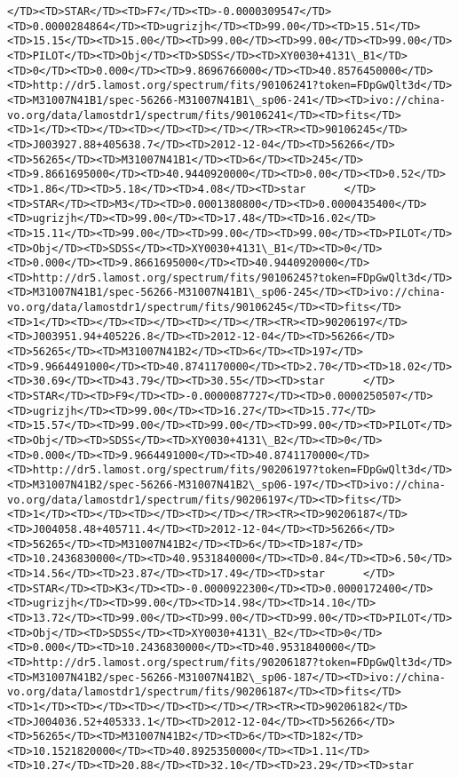 \documentclass[11pt]{article}
\begin{document}
\begin{Verbatim}[commandchars=\\\{\}]
     </TD><TD>STAR</TD><TD>F7</TD><TD>-0.0000309547</TD><TD>0.0000284864</TD><TD>ugrizjh</TD><TD>99.00</TD><TD>15.51</TD><TD>15.15</TD><TD>15.00</TD><TD>99.00</TD><TD>99.00</TD><TD>99.00</TD><TD>PILOT</TD><TD>Obj</TD><TD>SDSS</TD><TD>XY0030+4131\_B1</TD><TD>0</TD><TD>0.000</TD><TD>9.8696766000</TD><TD>40.8576450000</TD><TD>http://dr5.lamost.org/spectrum/fits/90106241?token=FDpGwQlt3d</TD><TD>M31007N41B1/spec-56266-M31007N41B1\_sp06-241</TD><TD>ivo://china-vo.org/data/lamostdr1/spectrum/fits/90106241</TD><TD>fits</TD><TD>1</TD><TD></TD><TD></TD><TD></TD></TR><TR><TD>90106245</TD><TD>J003927.88+405638.7</TD><TD>2012-12-04</TD><TD>56266</TD><TD>56265</TD><TD>M31007N41B1</TD><TD>6</TD><TD>245</TD><TD>9.8661695000</TD><TD>40.9440920000</TD><TD>0.00</TD><TD>0.52</TD><TD>1.86</TD><TD>5.18</TD><TD>4.08</TD><TD>star      </TD><TD>STAR</TD><TD>M3</TD><TD>0.0001380800</TD><TD>0.0000435400</TD><TD>ugrizjh</TD><TD>99.00</TD><TD>17.48</TD><TD>16.02</TD><TD>15.11</TD><TD>99.00</TD><TD>99.00</TD><TD>99.00</TD><TD>PILOT</TD><TD>Obj</TD><TD>SDSS</TD><TD>XY0030+4131\_B1</TD><TD>0</TD><TD>0.000</TD><TD>9.8661695000</TD><TD>40.9440920000</TD><TD>http://dr5.lamost.org/spectrum/fits/90106245?token=FDpGwQlt3d</TD><TD>M31007N41B1/spec-56266-M31007N41B1\_sp06-245</TD><TD>ivo://china-vo.org/data/lamostdr1/spectrum/fits/90106245</TD><TD>fits</TD><TD>1</TD><TD></TD><TD></TD><TD></TD></TR><TR><TD>90206197</TD><TD>J003951.94+405226.8</TD><TD>2012-12-04</TD><TD>56266</TD><TD>56265</TD><TD>M31007N41B2</TD><TD>6</TD><TD>197</TD><TD>9.9664491000</TD><TD>40.8741170000</TD><TD>2.70</TD><TD>18.02</TD><TD>30.69</TD><TD>43.79</TD><TD>30.55</TD><TD>star      </TD><TD>STAR</TD><TD>F9</TD><TD>-0.0000087727</TD><TD>0.0000250507</TD><TD>ugrizjh</TD><TD>99.00</TD><TD>16.27</TD><TD>15.77</TD><TD>15.57</TD><TD>99.00</TD><TD>99.00</TD><TD>99.00</TD><TD>PILOT</TD><TD>Obj</TD><TD>SDSS</TD><TD>XY0030+4131\_B2</TD><TD>0</TD><TD>0.000</TD><TD>9.9664491000</TD><TD>40.8741170000</TD><TD>http://dr5.lamost.org/spectrum/fits/90206197?token=FDpGwQlt3d</TD><TD>M31007N41B2/spec-56266-M31007N41B2\_sp06-197</TD><TD>ivo://china-vo.org/data/lamostdr1/spectrum/fits/90206197</TD><TD>fits</TD><TD>1</TD><TD></TD><TD></TD><TD></TD></TR><TR><TD>90206187</TD><TD>J004058.48+405711.4</TD><TD>2012-12-04</TD><TD>56266</TD><TD>56265</TD><TD>M31007N41B2</TD><TD>6</TD><TD>187</TD><TD>10.2436830000</TD><TD>40.9531840000</TD><TD>0.84</TD><TD>6.50</TD><TD>14.56</TD><TD>23.87</TD><TD>17.49</TD><TD>star      </TD><TD>STAR</TD><TD>K3</TD><TD>-0.0000922300</TD><TD>0.0000172400</TD><TD>ugrizjh</TD><TD>99.00</TD><TD>14.98</TD><TD>14.10</TD><TD>13.72</TD><TD>99.00</TD><TD>99.00</TD><TD>99.00</TD><TD>PILOT</TD><TD>Obj</TD><TD>SDSS</TD><TD>XY0030+4131\_B2</TD><TD>0</TD><TD>0.000</TD><TD>10.2436830000</TD><TD>40.9531840000</TD><TD>http://dr5.lamost.org/spectrum/fits/90206187?token=FDpGwQlt3d</TD><TD>M31007N41B2/spec-56266-M31007N41B2\_sp06-187</TD><TD>ivo://china-vo.org/data/lamostdr1/spectrum/fits/90206187</TD><TD>fits</TD><TD>1</TD><TD></TD><TD></TD><TD></TD></TR><TR><TD>90206182</TD><TD>J004036.52+405333.1</TD><TD>2012-12-04</TD><TD>56266</TD><TD>56265</TD><TD>M31007N41B2</TD><TD>6</TD><TD>182</TD><TD>10.1521820000</TD><TD>40.8925350000</TD><TD>1.11</TD><TD>10.27</TD><TD>20.88</TD><TD>32.10</TD><TD>23.29</TD><TD>star      
\end{Verbatim}
\end{document}
